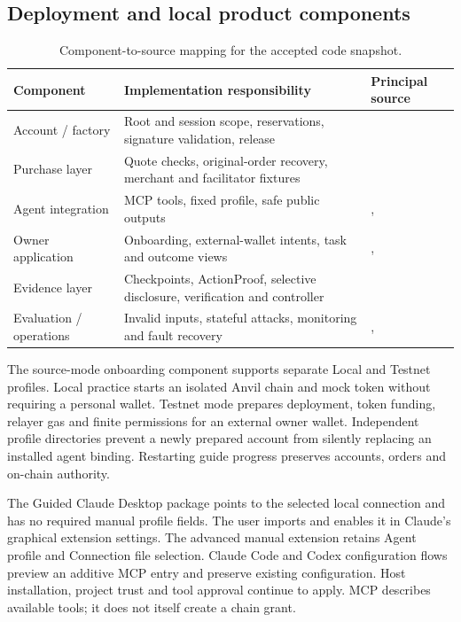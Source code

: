 \subsection{Deployment and local product components}
\begin{table}[htbp]\centering\small
\begin{tabularx}{\linewidth}{L{3.1cm}YL{4.2cm}}\toprule
Component & Implementation responsibility & Principal source\\\midrule
Account / factory & Root and session scope, reservations, signature validation, release & \\
Purchase layer & Quote checks, original-order recovery, merchant and facilitator fixtures & \\
Agent integration & MCP tools, fixed profile, safe public outputs & , \\
Owner application & Onboarding, external-wallet intents, task and outcome views & , \\
Evidence layer & Checkpoints, ActionProof, selective disclosure, verification and controller & \\
Evaluation / operations & Invalid inputs, stateful attacks, monitoring and fault recovery & , \\\bottomrule
\end{tabularx}\caption{Component-to-source mapping for the accepted code snapshot.}\label{tab:components}\end{table}

The source-mode onboarding component supports separate Local and Testnet profiles. Local practice starts an isolated Anvil chain and mock token without requiring a personal wallet. Testnet mode prepares deployment, token funding, relayer gas and finite permissions for an external owner wallet. Independent profile directories prevent a newly prepared account from silently replacing an installed agent binding. Restarting guide progress preserves accounts, orders and on-chain authority.

The Guided Claude Desktop package points to the selected local connection and has no required manual profile fields. The user imports and enables it in Claude's graphical extension settings. The advanced manual extension retains Agent profile and Connection file selection. Claude Code and Codex configuration flows preview an additive MCP entry and preserve existing configuration. Host installation, project trust and tool approval continue to apply. MCP describes available tools; it does not itself create a chain grant.\citep{mcp,implementation}


